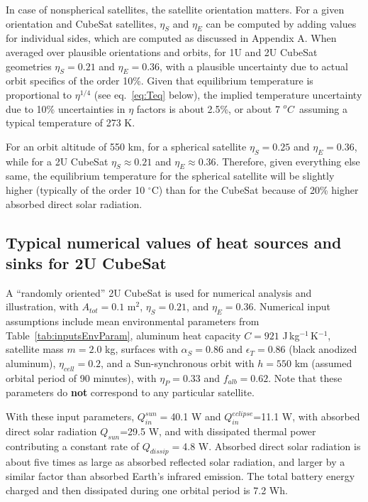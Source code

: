\documentclass[]{aastex62}
\def\dC     {\hbox{$^{o}C$}}
\begin{document}
In case of nonspherical satellites, the satellite orientation matters. For a given orientation and CubeSat
satellites, $\eta_S$ and $\eta_E$ can be computed by adding values for individual sides, which are 
computed as discussed in Appendix A.  When averaged over plausible orientations and orbits, 
for 1U and 2U CubeSat geometries $\eta_S = 0.21$ and $\eta_E = 0.36$, with a plausible uncertainty due to
actual orbit specifics of the order 10\%. 
Given that equilibrium temperature is proportional to 
$\eta^{1/4}$ (see eq.~\ref{eq:Teq} below), the implied temperature uncertainty due to 10\% uncertainties 
in $\eta$ factors is about 2.5\%, or about 7 \dC\ assuming a typical temperature of 273 K. 

For an orbit altitude of 550 km, for a spherical satellite $\eta_S = 0.25$ and $\eta_E =0.36$, while
for a 2U CubeSat $\eta_S \approx 0.21$ and $\eta_E \approx 0.36$. Therefore, given everything else same, 
the equilibrium temperature for the spherical satellite will be slightly higher (typically of the order 
10 $^\circ$C) than for the CubeSat because of 20\% higher absorbed direct solar radiation. 


\subsection{Typical numerical values of heat sources and sinks for 2U CubeSat} 

A ``randomly oriented'' 2U CubeSat is used for numerical analysis and illustration, with $A_{tot}=0.1$ m$^2$, $\eta_S=0.21$,
and $\eta_E=0.36$. Numerical input assumptions include mean environmental parameters from 
Table~\ref{tab:inputsEnvParam}, aluminum heat capacity $C=921$ J\,kg$^{-1}$\,K$^{-1}$, satellite 
mass $m=2.0$ kg, surfaces with $\alpha_S=0.86$ and $\epsilon_T=0.86$ (black anodized aluminum), 
$\eta_{cell}=0.2$,  and a Sun-synchronous orbit with $h=550$ km (assumed orbital period of 90 minutes), 
with $\eta_P=0.33$ and $f_{alb}=0.62$. Note that these parameters do {\bf not} correspond to any particular satellite.  

With these input parameters, $Q_{in}^{sun}=$40.1 W and $Q_{in}^{eclipse}$=11.1 W, with absorbed direct
solar radiation $Q_{sun}$=29.5 W, and with dissipated thermal power contributing a constant rate of
$Q_{dissip}=$4.8 W. Absorbed direct solar radiation is about five times as large as absorbed
reflected solar radiation, and larger by a similar factor than absorbed Earth's infrared emission. 
The total battery energy charged and then dissipated during one orbital period is 7.2 Wh. 
\end{document}
